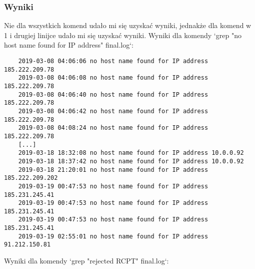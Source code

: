 \documentclass{article}
\begin{document}
\subsubsection{Wyniki}
Nie dla wszystkich komend udało mi się uzyskać wyniki, jednakże dla komend w 1 i drugiej linijce udało mi się uzyskać wyniki.
\newline
Wyniki dla komendy `grep "no host name found for IP address" final.log`:
\begin{verbatim}
    2019-03-08 04:06:06 no host name found for IP address 185.222.209.78
    2019-03-08 04:06:08 no host name found for IP address 185.222.209.78
    2019-03-08 04:06:40 no host name found for IP address 185.222.209.78
    2019-03-08 04:06:42 no host name found for IP address 185.222.209.78
    2019-03-08 04:08:24 no host name found for IP address 185.222.209.78
    [...]
    2019-03-18 18:32:08 no host name found for IP address 10.0.0.92
    2019-03-18 18:37:42 no host name found for IP address 10.0.0.92
    2019-03-18 21:20:01 no host name found for IP address 185.222.209.202
    2019-03-19 00:47:53 no host name found for IP address 185.231.245.41
    2019-03-19 00:47:53 no host name found for IP address 185.231.245.41
    2019-03-19 00:47:53 no host name found for IP address 185.231.245.41
    2019-03-19 02:55:01 no host name found for IP address 91.212.150.81
\end{verbatim}
Wyniki dla komendy `grep "rejected RCPT" final.log`:
\end{document}
